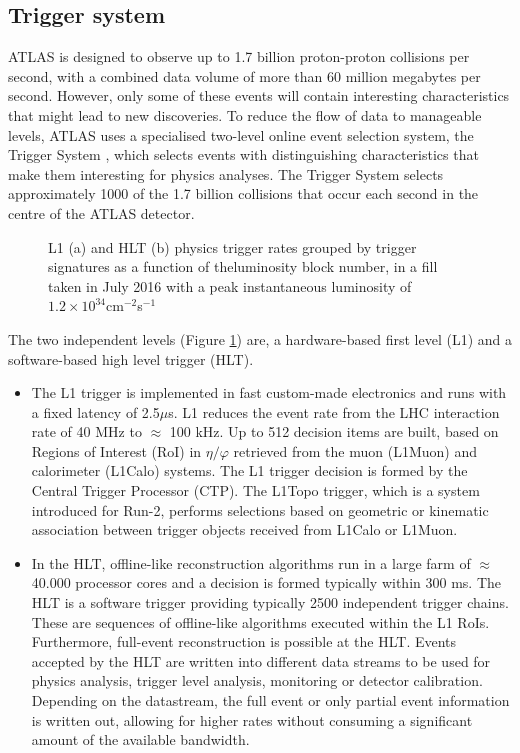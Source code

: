 \documentclass[a4paper, oneside, 11pt, openright]{book}
\begin{document}
			\subsection{Trigger system}
				ATLAS is designed to observe up to 1.7 billion proton-proton collisions per second, with a combined data volume of more than 60 million megabytes per second. However, only some of these events will contain interesting characteristics that might lead to new discoveries. To reduce the flow of data to manageable levels, ATLAS uses a specialised two-level online event selection system, the Trigger System \cite{trigger}, which selects events with distinguishing characteristics that make them interesting for physics analyses. The Trigger System selects approximately 1000 of the 1.7 billion collisions that occur each second in the centre of the ATLAS detector. 
				
				\begin{figure}
					\centering
					\caption{L1 (a) and HLT (b) physics trigger rates grouped by trigger signatures as a function of theluminosity block number, in a fill taken in July 2016 with a peak instantaneous luminosity of $1.2 \times 10^{34}$cm$^{-2}$s$^{-1}$}
					\label{fig:Trigger system}
				\end{figure}
				
				The two independent levels (Figure \ref{fig:Trigger system}) are, a hardware-based first level (L1) and a software-based high level trigger (HLT). 
				\begin{itemize}
					\item The L1 trigger is implemented in fast custom-made electronics and runs with a fixed latency of 2.5$\mu$s. L1 reduces the event rate from the LHC interaction rate of 40 MHz to $\approx$ 100 kHz. Up to 512 decision items are built, based on Regions of Interest (RoI) in $\eta/\varphi$ retrieved from the muon (L1Muon) and calorimeter (L1Calo) systems. The L1 trigger decision is formed by the Central Trigger Processor (CTP). The L1Topo trigger, which is a system introduced for Run-2, performs selections based on geometric or kinematic association between trigger objects received from L1Calo or L1Muon. 
					
					\item In the HLT, offline-like reconstruction algorithms run in a large farm of $\approx$ 40.000 processor cores and a decision is formed typically within 300 ms. The HLT is a software trigger providing typically 2500 independent trigger chains. These are sequences of offline-like algorithms executed within the L1 RoIs. Furthermore, full-event reconstruction is possible at the HLT. Events accepted by the HLT are written into different data streams to be used for physics analysis, trigger level analysis, monitoring or detector calibration. Depending on the datastream, the full event or only partial event information is written out, allowing for higher rates without consuming a significant amount of the available bandwidth.
				\end{itemize}
		
\end{document}
